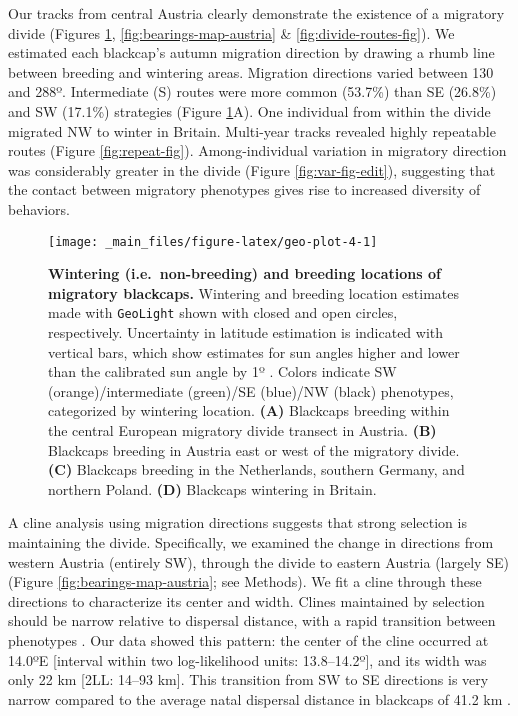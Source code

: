 \documentclass[a4paper, nobind]{templates/ociamthesis}
\begin{document}
Our tracks from central Austria clearly demonstrate the existence of a migratory divide (Figures \ref{fig:geo-plot-4}, \ref{fig:bearings-map-austria} \& \ref{fig:divide-routes-fig}). We estimated each blackcap's autumn migration direction by drawing a rhumb line between breeding and wintering areas. Migration directions varied between 130 and 288º. Intermediate (S) routes were more common (53.7\%) than SE (26.8\%) and SW (17.1\%) strategies (Figure \ref{fig:geo-plot-4}A). One individual from within the divide migrated NW to winter in Britain. Multi-year tracks revealed highly repeatable routes (Figure \ref{fig:repeat-fig}). Among-individual variation in migratory direction was considerably greater in the divide (Figure \ref{fig:var-fig-edit}), suggesting that the contact between migratory phenotypes gives rise to increased diversity of behaviors.



\begin{figure}
\texttt{[image: \_main\_files/figure-latex/geo-plot-4-1]} \caption{\textbf{Wintering (i.e.~non-breeding) and breeding locations of migratory blackcaps.} Wintering and breeding location estimates made with \texttt{GeoLight} shown with closed and open circles, respectively. Uncertainty in latitude estimation is indicated with vertical bars, which show estimates for sun angles higher and lower than the calibrated sun angle by 1º \autocite[following][]{hiemerFirstTracksIndividual2018}. Colors indicate SW (orange)/intermediate (green)/SE (blue)/NW (black) phenotypes, categorized by wintering location. \textbf{(A)} Blackcaps breeding within the central European migratory divide transect in Austria. \textbf{(B)} Blackcaps breeding in Austria east or west of the migratory divide. \textbf{(C)} Blackcaps breeding in the Netherlands, southern Germany, and northern Poland. \textbf{(D)} Blackcaps wintering in Britain.}\label{fig:geo-plot-4}
\end{figure}

A cline analysis using migration directions suggests that strong selection is maintaining the divide. Specifically, we examined the change in directions from western Austria (entirely SW), through the divide to eastern Austria (largely SE) (Figure \ref{fig:bearings-map-austria}; see Methods). We fit a cline through these directions to characterize its center and width. Clines maintained by selection should be narrow relative to dispersal distance, with a rapid transition between phenotypes \autocite{bartonGeneticAnalysisHybrid1993}. Our data showed this pattern: the center of the cline occurred at 14.0ºE {[}interval within two log-likelihood units: 13.8--14.2º{]}, and its width was only 22 km {[}2LL: 14--93 km{]}. This transition from SW to SE directions is very narrow compared to the average natal dispersal distance in blackcaps of 41.2 km \autocite{paradisPatternsNatalBreeding1998}.
\end{document}
